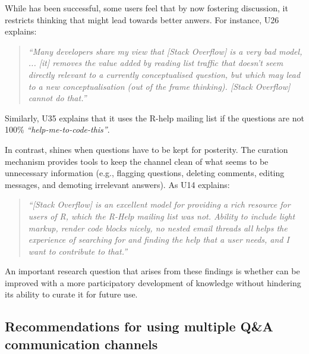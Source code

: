 While \SO  has been successful, some users feel that by now fostering discussion, it restricts thinking that might lead towards better anwers. 
For instance, U26 explains:
    \begin{quote}
        \textit{``Many developers share my view that [Stack Overflow] is a very bad model, ... [it] removes the value added by reading list traffic that doesn't seem directly relevant to a currently conceptualised question, but which may lead to a new conceptualisation (out of the frame thinking). [Stack Overflow] cannot do that.''}
    \end{quote}
    Similarly, U35 explains that it uses the R-help mailing list if the questions are not 100\% \textit{``help-me-to-code-this''}.

    In contrast, \SO shines when questions have to be kept for posterity. 
    The curation mechanism provides tools to keep the channel clean of what seems to be unnecessary information (e.g., flagging questions, deleting comments, editing messages, and demoting irrelevant answers). As U14 explains:

    \begin{quote}
        \textit{``[Stack Overflow] is an excellent model for providing a rich resource for users of R, which the R-Help mailing list was not. 
        Ability to include light markup, render code blocks nicely, no nested email threads all helps the experience of searching for and finding the help that a user needs, and I want to contribute to that.''}
    \end{quote}


An important research question that arises from these findings is whether \SO can be improved with a more participatory development of knowledge without
hindering its ability to curate it for future use.



\subsection{Recommendations for using multiple Q\&A communication channels}

